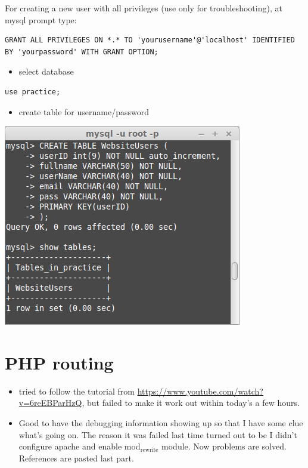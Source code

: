 \documentclass[9pt,b5paper]{article}
\begin{document}
For creating a new user with all privileges (use only for troubleshooting), at mysql prompt type:

\lstset{language=SQL,label= ,caption= ,numbers=none}
\begin{lstlisting}
GRANT ALL PRIVILEGES ON *.* TO 'yourusername'@'localhost' IDENTIFIED BY 'yourpassword' WITH GRANT OPTION;
\end{lstlisting}

\begin{itemize}
\item select database
\end{itemize}
\lstset{language=SQL,label= ,caption= ,numbers=none}
\begin{lstlisting}
use practice;
\end{lstlisting}

\begin{itemize}
\item create table for username/password
\end{itemize}
\includegraphics[width=.9\linewidth]{./pic/db.png}

\section{PHP routing}
\label{sec-2}
\begin{itemize}
\item tried to follow the tutorial from \url{https://www.youtube.com/watch?v=6reEBParHzQ}, but failed to make it work out within today's a few hours.
\item Good to have the debugging information showing up so that I have some clue what's going on. The reason it was failed last time turned out to be I didn't configure apache and enable mod$_{\text{rewrite}}$ module. Now problems are solved. References are pasted last part.
\end{itemize}
\end{document}
